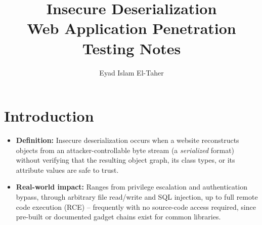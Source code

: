 \documentclass[11pt]{article}
\title{\textbf{Insecure Deserialization}\\\large Web Application Penetration Testing Notes}
\author{Eyad Islam El-Taher}
\date{}
\begin{document}
\maketitle
\tableofcontents
\newpage

\section{Introduction}
\begin{itemize}
    \item \textbf{Definition:} Insecure deserialization occurs when a website reconstructs objects from an attacker-controllable byte stream (a \textit{serialized} format) without verifying that the resulting object graph, its class types, or its attribute values are safe to trust.
    \item \textbf{Real-world impact:} Ranges from privilege escalation and authentication bypass, through arbitrary file read/write and SQL injection, up to full remote code execution (RCE) -- frequently with no source-code access required, since pre-built or documented gadget chains exist for common libraries.
\end{itemize}

\end{document}
